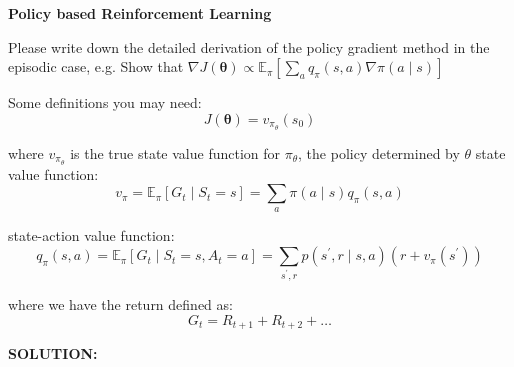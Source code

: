 \documentclass{homework}
\begin{document}
\begin{shaded}
\question \textbf{Policy based Reinforcement Learning}

Please write down the detailed derivation of the policy gradient method in the episodic case, e.g. Show that $\nabla J(\boldsymbol{\theta}) \propto \mathbb{E}_{\pi}\left[\sum_{a} q_{\pi}(s, a) \nabla \pi(a \mid s)\right]$

Some definitions you may need:
$$
J(\boldsymbol{\theta})=v_{\pi_{\theta}}\left(s_{0}\right)
$$

where $v_{\pi_{\theta}}$ is the true state value function for $\pi_{\theta}$, the policy determined by $\theta$ state value function:
$$
v_{\pi}=\mathbb{E}_{\pi}\left[G_{t} \mid S_{t}=s\right]=\sum_{a} \pi(a \mid s) q_{\pi}(s, a)
$$

state-action value function:
$$
q_{\pi}(s, a)=\mathbb{E}_{\pi}\left[G_{t} \mid S_{t}=s, A_{t}=a\right]=\sum_{s^{\prime}, r} p\left(s^{\prime}, r \mid s, a\right)\left(r+v_{\pi}\left(s^{\prime}\right)\right)
$$

where we have the return defined as:
$$
G_{t}=R_{t+1}+R_{t+2}+\ldots
$$

\end{shaded}

\textbf{SOLUTION:}

% 
% 
\end{document}
